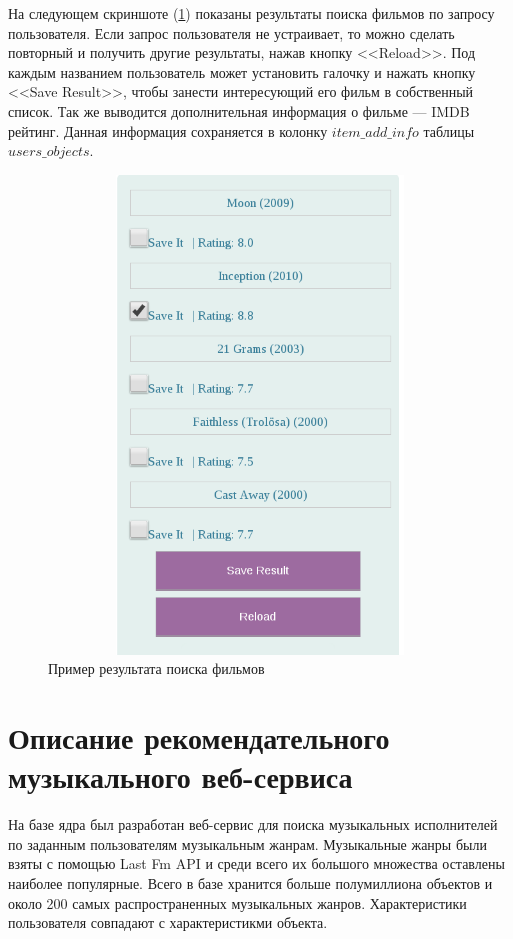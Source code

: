 На следующем скриншоте (\ref{pic:ml-screen2}) показаны результаты поиска фильмов по запросу пользователя. Если запрос пользователя не устраивает, то
можно сделать повторный и получить другие результаты, нажав кнопку <<Reload>>. Под каждым названием пользователь может
установить галочку и нажать кнопку <<Save Result>>, чтобы занести интересующий его фильм в собственный список.
Так же выводится дополнительная информация о фильме --- IMDB рейтинг. Данная информация сохраняется в колонку  $item\_add\_info$
таблицы $users\_objects$.
\begin{figure}
\caption{Пример результата поиска фильмов}
\label{pic:ml-screen2}
\begin{center}
  \includegraphics[width=5in,height=5in]{pics/ml-rslt.png}
\end{center}
\end{figure}

\section{Описание рекомендательного музыкального веб-сервиса}
На базе ядра был разработан веб-сервис для поиска музыкальных исполнителей
по заданным пользователям музыкальным жанрам. Музыкальные жанры были
взяты с помощью Last Fm API и среди всего их большого множества оставлены
наиболее
популярные. Всего в базе хранится больше полумиллиона объектов и около 200
самых
распространенных музыкальных жанров. Характеристики пользователя совпадают с
характеристикми объекта.

